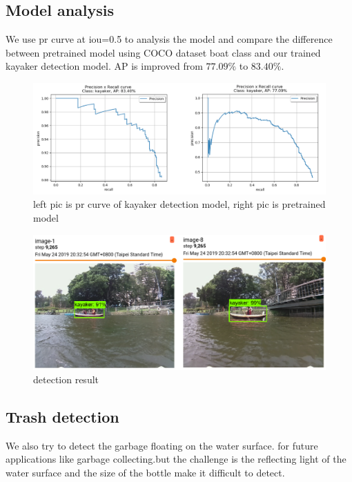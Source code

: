 \subsection{Model analysis}

We use pr curve at iou=0.5 to analysis the model and compare the difference between pretrained model using COCO dataset boat class and our trained kayaker detection model. AP is improved from $77.09\%$ to $83.40\%$. 

\begin{figure}[H]
    \includegraphics[width=1\columnwidth]{images/kayaker_pr.png}
    \centering
    \caption{left pic is pr curve of kayaker detection model, right pic is pretrained model}
    \label{figure:kayaker_pr}
\end{figure}
\begin{figure}[H]
    \includegraphics[width=1\columnwidth]{images/kayaker_dt.png}
    \centering
    \caption{detection result}
    \label{figure:kayaker_dt}
\end{figure}

\subsection{Trash detection}

We also try to detect the garbage floating on the water surface. for future applications like garbage collecting.but the challenge is the reflecting light of the water surface and the size of the bottle make it difficult to detect.

